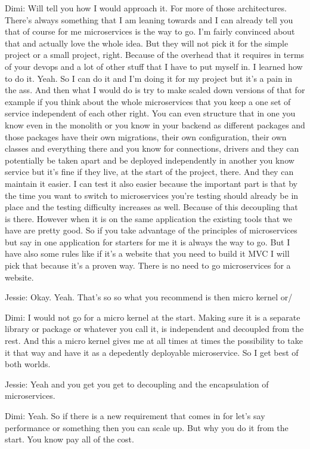 Dimi: Will tell you how I would approach it. For more of those architectures. There's always something that I am leaning towards and I can already tell you that of course for me microservices is the way to go. I'm fairly convinced about that and actually love the whole idea. But they will not pick it for the simple project or a small project, right. Because of the overhead that it requires in terms of your devops and a lot of other stuff that I have to put myself in. I learned how to do it. Yeah. So I can do it and I'm doing it for my project but it's a pain in the ass. And then what I would do is try to make scaled down versions of that for example if you think about the whole microservices that you keep a one set of service independent of each other right. You can even structure that in one you know even in the monolith or you know in your backend as different packages and those packages have their own migrations, their own configuration, their own classes and everything there and you know for connections, drivers and they can potentially be taken apart and be deployed independently in another you know service but it's fine if they live, at the start of the project, there. And they can maintain it easier. I can test it also easier because the important part is that by the time you want to switch to microservices you're testing should already be in place and the testing difficulty increases as well. Because of this decoupling that is there. However when it is on the same application the existing tools that we have are pretty good. So if you take advantage of the principles of microservices but say in one application for starters for me it is always the way to go. But I have also some rules like if it's a website that you need to build it MVC I will pick that because it's a proven way. There is no need to go microservices for a website.

Jessie: Okay. Yeah. That's so so what you recommend is then micro kernel or/

Dimi: I would not go for a micro kernel at the start. Making sure it is a separate library or package or whatever you call it, is independent and decoupled from the rest. And this a micro kernel gives me at all times at times the possibility to take it that way and have it as a depedently deployable microservice. So I get best of both worlds.

Jessie: Yeah and you get you get to decoupling and the encapsulation of microservices.

Dimi: Yeah. So if there is a new requirement that comes in for let's say performance or something then you can scale up. But why you do it from the start. You know pay all of the cost.

